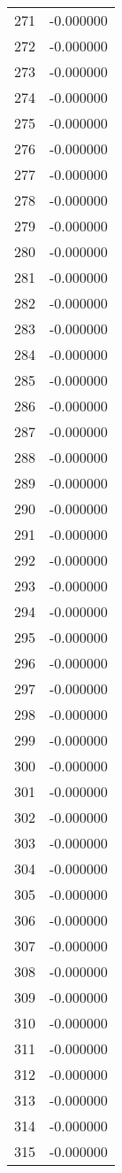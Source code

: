 \documentclass[12pt]{article}
\begin{document}
\begin{longtable}{@{}cc@{}}
271 & -0.000000 \\
272 & -0.000000 \\
273 & -0.000000 \\
274 & -0.000000 \\
275 & -0.000000 \\
276 & -0.000000 \\
277 & -0.000000 \\
278 & -0.000000 \\
279 & -0.000000 \\
280 & -0.000000 \\
281 & -0.000000 \\
282 & -0.000000 \\
283 & -0.000000 \\
284 & -0.000000 \\
285 & -0.000000 \\
286 & -0.000000 \\
287 & -0.000000 \\
288 & -0.000000 \\
289 & -0.000000 \\
290 & -0.000000 \\
291 & -0.000000 \\
292 & -0.000000 \\
293 & -0.000000 \\
294 & -0.000000 \\
295 & -0.000000 \\
296 & -0.000000 \\
297 & -0.000000 \\
298 & -0.000000 \\
299 & -0.000000 \\
300 & -0.000000 \\
301 & -0.000000 \\
302 & -0.000000 \\
303 & -0.000000 \\
304 & -0.000000 \\
305 & -0.000000 \\
306 & -0.000000 \\
307 & -0.000000 \\
308 & -0.000000 \\
309 & -0.000000 \\
310 & -0.000000 \\
311 & -0.000000 \\
312 & -0.000000 \\
313 & -0.000000 \\
314 & -0.000000 \\
315 & -0.000000 \\

\end{longtable}
\end{document}
